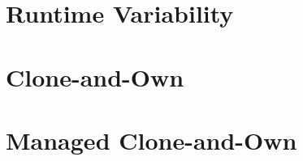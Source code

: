 

\subtitle{2. Runtime Variability and Clone-and-Own}
\author{Timo Kehrer}





\section{Runtime Variability}



\lessonslearned{
	\item \ldots
}{
	\item \ldots
}{
	\ldots
}

\sectionend

\section{Clone-and-Own}



\lessonslearned{
	\item \ldots
}{
	\item \ldots
}{
	\ldots
}

\sectionend

\section{Managed Clone-and-Own}



\lessonslearned{
	\item \ldots
}{
	\item \ldots
}{
	\ldots
}




